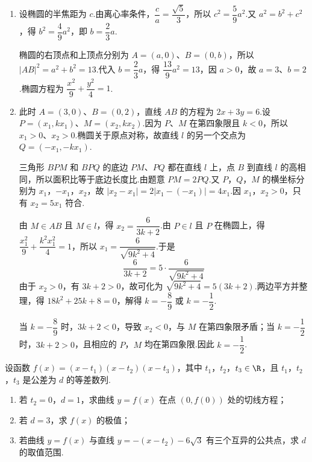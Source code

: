 \begin{solution}
\begin{enumerate}
\item 设椭圆的半焦距为 \(c\).由离心率条件，\(\dfrac ca=\dfrac{\sqrt5}{3}\)，所以 \(c^2=\dfrac59a^2\).又 \(a^2=b^2+c^2\)，得 \(b^2=\dfrac49a^2\)，即 \(b=\dfrac23a\).

椭圆的右顶点和上顶点分别为 \(A=(a,0)\)、\(B=(0,b)\)，所以 \(|AB|^2=a^2+b^2=13\).代入 \(b=\dfrac23a\)，得 \(\dfrac{13}{9}a^2=13\)，因 \(a>0\)，故 \(a=3\)、\(b=2\).椭圆方程为 \(\dfrac{x^2}{9}+\dfrac{y^2}{4}=1\).

\item 此时 \(A=(3,0)\)、\(B=(0,2)\)，直线 \(AB\) 的方程为 \(2x+3y=6\).设 \(P=(x_1,kx_1)\)、\(M=(x_2,kx_2)\).因为 \(P\)、\(M\) 在第四象限且 \(k<0\)，所以 \(x_1>0\)、\(x_2>0\).椭圆关于原点对称，故直线 \(l\) 的另一个交点为 \(Q=(-x_1,-kx_1)\).

三角形 \(BPM\) 和 \(BPQ\) 的底边 \(PM\)、\(PQ\) 都在直线 \(l\) 上，点 \(B\) 到直线 \(l\) 的高相同，所以面积比等于底边长度比.由题意
\(PM=2PQ\).又 \(P\)，\(Q\)，\(M\) 的横坐标分别为 \(x_1\)，\(-x_1\)，\(x_2\)，故
\(|x_2-x_1|=2|x_1-(-x_1)|=4x_1\).因 \(x_1\)，\(x_2>0\)，只有 \(x_2=5x_1\) 符合.

由 \(M\in AB\) 且 \(M\in l\)，得
\(x_2=\dfrac{6}{3k+2}\).由 \(P\in l\) 且 \(P\) 在椭圆上，得
\(\dfrac{x_1^2}{9}+\dfrac{k^2x_1^2}{4}=1\)，所以 \(x_1=\dfrac{6}{\sqrt{9k^2+4}}\).于是
\[
\frac{6}{3k+2}=5\cdot\frac{6}{\sqrt{9k^2+4}}
\]
由于 \(x_2>0\)，有 \(3k+2>0\)，故可化为 \(\sqrt{9k^2+4}=5(3k+2)\).两边平方并整理，得 \(18k^2+25k+8=0\)，解得 \(k=-\dfrac89\) 或 \(k=-\dfrac12\).

当 \(k=-\dfrac89\) 时，\(3k+2<0\)，导致 \(x_2<0\)，与 \(M\) 在第四象限矛盾；当 \(k=-\dfrac12\) 时，\(3k+2>0\)，且相应的 \(P\)，\(M\) 均在第四象限.因此 \(k=-\dfrac12\).
\end{enumerate}
\end{solution}

\begin{problem}

设函数 \(f(x)=(x-t_1)(x-t_2)(x-t_3)\)，其中 \(t_1\)，\(t_2\)，\(t_3\in\R\)，且 \(t_1\)，\(t_2\)，\(t_3\) 是公差为 \(d\) 的等差数列.

\begin{enumerate}
\item 若 \(t_2=0\)，\(d=1\)，求曲线 \(y=f(x)\) 在点 \((0,f(0))\) 处的切线方程；
\item 若 \(d=3\)，求 \(f(x)\) 的极值；
\item 若曲线 \(y=f(x)\) 与直线 \(y=-(x-t_2)-6\sqrt3\) 有三个互异的公共点，求 \(d\) 的取值范围.
\end{enumerate}
\end{problem}

